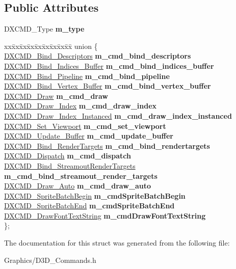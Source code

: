 \subsection*{Public Attributes}
\begin{DoxyCompactItemize}
\item 
\mbox{\label{structDXCMD_a39e66e1bc291370729071a1e3bf681eb}} 
D\+X\+C\+M\+D\+\_\+\+Type {\bfseries m\+\_\+type}
\item 
\mbox{\label{structDXCMD_a223ce217841475147d2bad16b20709d9}} 
\begin{tabbing}
xx\=xx\=xx\=xx\=xx\=xx\=xx\=xx\=xx\=\kill
union \{\\
\>\hyperlink{structDXCMD__Bind__Descriptors}{DXCMD\_Bind\_Descriptors} {\bfseries m\_cmd\_bind\_descriptors}\\
\>\hyperlink{structDXCMD__Bind__Indices__Buffer}{DXCMD\_Bind\_Indices\_Buffer} {\bfseries m\_cmd\_bind\_indices\_buffer}\\
\>\hyperlink{structDXCMD__Bind__Pipeline}{DXCMD\_Bind\_Pipeline} {\bfseries m\_cmd\_bind\_pipeline}\\
\>\hyperlink{structDXCMD__Bind__Vertex__Buffer}{DXCMD\_Bind\_Vertex\_Buffer} {\bfseries m\_cmd\_bind\_vertex\_buffer}\\
\>\hyperlink{structDXCMD__Draw}{DXCMD\_Draw} {\bfseries m\_cmd\_draw}\\
\>\hyperlink{structDXCMD__Draw__Index}{DXCMD\_Draw\_Index} {\bfseries m\_cmd\_draw\_index}\\
\>\hyperlink{structDXCMD__Draw__Index__Instanced}{DXCMD\_Draw\_Index\_Instanced} {\bfseries m\_cmd\_draw\_index\_instanced}\\
\>\hyperlink{structDXCMD__Set__Viewport}{DXCMD\_Set\_Viewport} {\bfseries m\_cmd\_set\_viewport}\\
\>\hyperlink{structDXCMD__Update__Buffer}{DXCMD\_Update\_Buffer} {\bfseries m\_cmd\_update\_buffer}\\
\>\hyperlink{structDXCMD__Bind__RenderTargets}{DXCMD\_Bind\_RenderTargets} {\bfseries m\_cmd\_bind\_rendertargets}\\
\>\hyperlink{structDXCMD__Dispatch}{DXCMD\_Dispatch} {\bfseries m\_cmd\_dispatch}\\
\>\hyperlink{structDXCMD__Bind__StreamoutRenderTargets}{DXCMD\_Bind\_StreamoutRenderTargets} {\bfseries m\_cmd\_bind\_streamout\_render\_targets}\\
\>\hyperlink{structDXCMD__Draw__Auto}{DXCMD\_Draw\_Auto} {\bfseries m\_cmd\_draw\_auto}\\
\>\hyperlink{structDXCMD__SpriteBatchBegin}{DXCMD\_SpriteBatchBegin} {\bfseries m\_cmdSpriteBatchBegin}\\
\>\hyperlink{structDXCMD__SpriteBatchEnd}{DXCMD\_SpriteBatchEnd} {\bfseries m\_cmdSpriteBatchEnd}\\
\>\hyperlink{structDXCMD__DrawFontTextString}{DXCMD\_DrawFontTextString} {\bfseries m\_cmdDrawFontTextString}\\
\}; \\

\end{tabbing}\end{DoxyCompactItemize}


The documentation for this struct was generated from the following file\+:\begin{DoxyCompactItemize}
\item 
Graphics/D3\+D\+\_\+\+Commands.\+h\end{DoxyCompactItemize}
